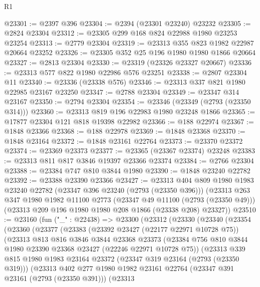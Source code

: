\begin{lexlean}{R1}
\begin{coremodule}
@23301 := @2397 @396
@23304 := @2394 (@23301 @23240) @23232
@23305 := @2824 @23304
@23312 := @23305 @299 @168 @824 @22988 @1980 @23253 @23254
@23313 := @2779 @23304
@23319 := @23313 @355 @823 @1982 @22987 @20664 @23252
@23326 := @23305 @352 @25 @196 @1980 @1980 @1866 @20664
@23327 := @2813 @23304
@23330 := @23319 (@23326 @23327 @20667)
@23336 := @23313 @577 @822 @1980 @22986 @576 @23251
@23338 := @2807 @23304 @11
@23340 := @23336 (@23338 @576)
@23346 := @23313 @337 @821 @1980 @22985 @23167 @23250
@23347 := @2788 @23304
@23349 := @23347 @314 @23167
@23350 := @2794 @23304
@23354 := @23346 (@23349 (@2793 (@23350 @314)))
@23360 := @23313 @819 @196 @22983 @1980 @23248 @1866
@23365 := @17877 @23304 @121 @818 @19398 @22982
@23366 := @188 @22974
@23367 := @1848 @23366
@23368 := @188 @22978
@23369 := @1848 @23368
@23370 := @1848 @23164
@23372 := @1848 @23161 @22764
@23373 := @23370 @23372
@23374 := @23369 @23373
@23377 := @23365 (@23367 @23374) @23248
@23383 := @23313 @811 @817 @3846 @19397 @23366 @23374
@23384 := @2766 @23304
@23388 := @23384 @747 @810 @3844 @1980
@23390 := @1848 @23240 @22782
@23392 := @23388 @23390 @23366
@23427 := @23313
    @404
    @809
    @1980
    @1983
    @23240
    @22782
    (@23347 @396 @23240 (@2793 (@23350 @396)))
    (@23313
      @263
      @347
      @1980
      @1982
      @11100
      @2773
      (@23347 @49 @11100 (@2793 (@23350 @49)))
      (@23313 @209 @196 @1980 @1980 @208 @1866 (@23338 @208) @23327))
@23510 := @23160
    (fun ("_" : @22438) =>
    @23300
      (@23312
        (@23330
          (@23340
            (@23354
              (@23360
                (@23377
                  (@23383
                    (@23392 @23427 (@22177 @22971 @10728 @75))
                    (@23313
                      @813
                      @816
                      @3846
                      @3844
                      @23368
                      @23373
                      (@23384 @756 @810 @3844 @1980 @23390 @23368 @23427 (@22246 @22971 @10728 @75))
                      (@23313
                        @339
                        @815
                        @1980
                        @1983
                        @23164
                        @23372
                        (@23347 @319 @23164 (@2793 (@23350 @319)))
                        (@23313
                          @402
                          @277
                          @1980
                          @1982
                          @23161
                          @22764
                          (@23347 @391 @23161 (@2793 (@23350 @391)))
                          (@23313

\end{coremodule}
\end{lexlean}
